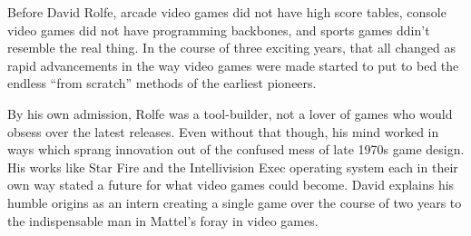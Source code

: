 Before David Rolfe, arcade video games did not have high score tables, console video games did not have programming backbones, and sports games ddin’t resemble the real thing. In the course of three exciting years, that all changed as rapid advancements in the way video games were made started to put to bed the endless “from scratch” methods of the earliest pioneers.

By his own admission, Rolfe was a tool-builder, not a lover of games who would obsess over the latest releases. Even without that though, his mind worked in ways which sprang innovation out of the confused mess of late 1970s game design. His works like Star Fire and the Intellivision Exec operating system each in their own way stated a future for what video games could become. David explains his humble origins as an intern creating a single game over the course of two years to the indispensable man in Mattel’s foray in video games.

\noindent\makebox[\linewidth]{\rule{\paperwidth}{0.4pt}}